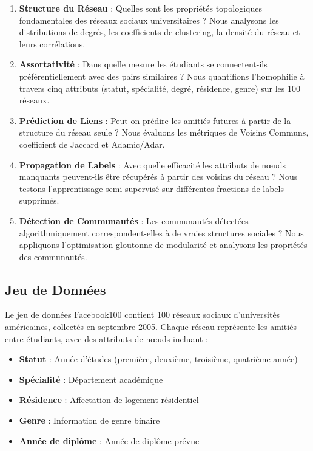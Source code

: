 \documentclass[12pt,a4paper]{article}
\begin{document}
\begin{enumerate}
    \item \textbf{Structure du Réseau} : Quelles sont les propriétés topologiques fondamentales des réseaux sociaux universitaires ? Nous analysons les distributions de degrés, les coefficients de clustering, la densité du réseau et leurs corrélations.
    
    \item \textbf{Assortativité} : Dans quelle mesure les étudiants se connectent-ils préférentiellement avec des pairs similaires ? Nous quantifions l'homophilie à travers cinq attributs (statut, spécialité, degré, résidence, genre) sur les 100 réseaux.
    
    \item \textbf{Prédiction de Liens} : Peut-on prédire les amitiés futures à partir de la structure du réseau seule ? Nous évaluons les métriques de Voisins Communs, coefficient de Jaccard et Adamic/Adar.
    
    \item \textbf{Propagation de Labels} : Avec quelle efficacité les attributs de nœuds manquants peuvent-ils être récupérés à partir des voisins du réseau ? Nous testons l'apprentissage semi-supervisé sur différentes fractions de labels supprimés.
    
    \item \textbf{Détection de Communautés} : Les communautés détectées algorithmiquement correspondent-elles à de vraies structures sociales ? Nous appliquons l'optimisation gloutonne de modularité et analysons les propriétés des communautés.
\end{enumerate}

\subsection{Jeu de Données}

Le jeu de données Facebook100 contient 100 réseaux sociaux d'universités américaines, collectés en septembre 2005. Chaque réseau représente les amitiés entre étudiants, avec des attributs de nœuds incluant :
\begin{itemize}
    \item \textbf{Statut} : Année d'études (première, deuxième, troisième, quatrième année)
    \item \textbf{Spécialité} : Département académique
    \item \textbf{Résidence} : Affectation de logement résidentiel
    \item \textbf{Genre} : Information de genre binaire
    \item \textbf{Année de diplôme} : Année de diplôme prévue
\end{itemize}
\end{document}
